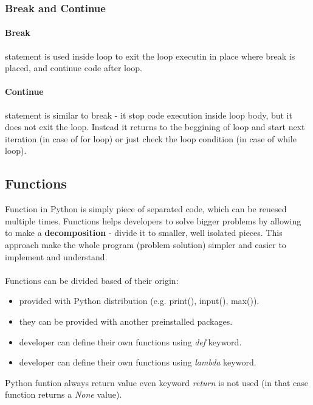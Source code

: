 \documentclass{article}
\begin{document}
	\subsubsection{Break and Continue}
	\paragraph{Break} statement is used inside loop to exit the loop executin in place where break is placed, and continue code after loop.
	\paragraph{Continue} statement is similar to break - it stop code execution inside loop body, but it does not exit the loop. Instead it returns to the beggining of loop and start next iteration (in case of for loop) or just check the loop condition (in case of while loop).


	\newpage
		\newpage
	\subsection{Functions}
	Function in Python is simply piece of separated code, which can be reuesed multiple times. Functions helps developers to solve bigger problems by allowing to make a \textbf{decomposition} - divide it to smaller, well isolated pieces. This approach make the whole program (problem solution) simpler and easier to implement and understand.
	\paragraph{}
	Functions can be divided based of their origin:
\begin{itemize}
\item provided with Python distribution (e.g. print(), input(), max()).
\item they can be provided with another preinstalled packages. \item developer can define their own functions using \textit{def} keyword.
\item developer can define their own functions using \textit{lambda} keyword.
\end{itemize}
Python funtion always return value even keyword \textit{return} is not used (in that case function returns a \textit{None} value).
\end{document}
